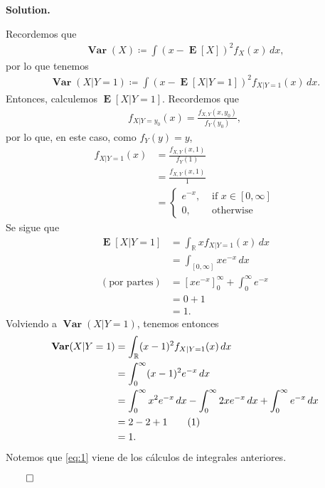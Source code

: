 \documentclass{article}
\newcommand\numberthis{\addtocounter{equation}{1}\tag{\theequation}}
\theoremstyle{problemstyle}
\newenvironment{solution}{%
  \begin{mdframed}[linewidth=0.8pt,linecolor=Gray,backgroundcolor=Gray!5,roundcorner=5pt]%
  \noindent\textbf{Solution.}%
}{%
\hfill $ \qed $ 
  \end{mdframed}%
}
\newcommand{\R}{\mathbb R}
\DeclareMathOperator{\Var}{\mathbf{Var}}
\DeclareMathOperator{\E}{\mathbf{E}}
\begin{document}
\begin{solution}
	Recordemos que
	\begin{align*}
		\Var(X) \coloneqq \int(x-\E[X])^2f_{X}(x)\,dx,
	\end{align*}
	por lo que tenemos
	\begin{align*}
		\Var(X|Y=1) \coloneqq \int(x-\E[X|Y=1])^2f_{X|Y=1}(x)\,dx.
	\end{align*}
	Entonces, calculemos $ \E[X|Y=1] $. Recordemos que
	\begin{align*}
		f_{X|Y=y_0}(x) = \frac{f_{X,Y}(x,y_0)}{f_Y(y_0)},
	\end{align*}
	por lo que, en este caso, como $ f_Y(y) = y $,
	\begin{align*}
		f_{X|Y=1}(x) & = \frac{f_{X,Y}(x,1)}{f_Y(1)}          \\
		             & = \frac{f_{X,Y}(x,1)}{1}               \\
		             & =\begin{cases}
			                e^{-x}, & \text{ if } x\in [0,\infty] \\
			                0,      & \text{ otherwise}
		                \end{cases}
	\end{align*}
	Se sigue que
	\begin{align*}
		\E[X|Y=1]           & = \int_{\R} x f_{X|Y=1}(x)\,dx                    \\
		                    & = \int_{[0,\infty]} x e^{-x}\,dx                  \\
		(\text{por partes}) & = [xe^{-x}]_{0}^{\infty}+\int_{0}^{\infty} e^{-x} \\
		                    & = 0 + 1                                           \\
		                    & = 1.
	\end{align*}
	Volviendo a $ \Var(X|Y=1) $, tenemos entonces
	\begin{align*}
		\Var(X|Y=1) & = \int_{\R} (x-1)^2 f_{X|Y=1}(x)\,dx                                                                \\
		            & = \int_{0}^{\infty} (x-1)^2 e^{-x}\,dx                                                              \\
		            & = \int_{0}^{\infty} x^2 e^{-x}\,dx - \int_{0}^{\infty} 2x e^{-x}\,dx + \int_{0}^{\infty} e^{-x}\,dx \\
		            & = 2 - 2 + 1\numberthis\label{eq:1}                                                                  \\
		            & = 1.
	\end{align*}
	Notemos que \eqref{eq:1} viene de los c\'alculos de integrales anteriores.


\end{solution}
\end{document}
